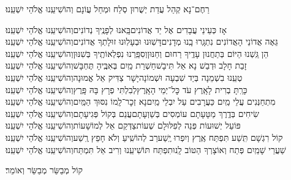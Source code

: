 \documentclass[twoside, openany, parskip=half, 11pt]{book}
\begin{document}
\begin{large}רַחֶם־נָא קְהַל עֲדַת יְשֻׁרוּן סְלַח וּמְחַל עֲוֹנָם וְהוֹשִׁיעֵֽנוּ אֱלֹהֵי יִשְׁעֵֽנוּ׃\end{large}

\begin{small}
	אָז כְּעֵינֵי עֲבָדִים אֶל יַד אֲדוֹנִים\hfill\break בָּֽאנוּ לְפָנֶֽיךָ נְדוֹנִים\hfill וְהוֹשִׁיעֵֽנוּ אֱלֹהֵי יִשְׁעֵֽנוּ׃\\
	גֵּאֶה אֲדוֹנֵי הָאֲדוֹנִים נִתְגָּֽרוּ בָֽנוּ מְדָנִים\hfill\break דָּשֽׁוּנוּ וּבְעָלֽוּנוּ זוּלָתְךָ אֲדוֹנִים\hfill וְהוֹשִׁיעֵֽנוּ אֱלֹהֵי יִשְׁעֵֽנוּ׃\\
	הֵן גַּֽשְׁנוּ הַיּוֹם בְּתַחֲנוּן עָדֶֽיךָ רַחוּם וְחַנּוּן\hfill\break וְסִפַּֽרְנוּ נִפְלְאוֹתֶֽיךָ בְּשִׁנּוּן\hfill וְהוֹשִׁיעֵֽנוּ אֱלֹהֵי יִשְׁעֵֽנוּ׃\\
	זָבַת חָלָב וּדְבַשׁ נָא אַל תִּיבָשׁ\hfill\break חַשְׁרַת מַֽיִם בְּאִבֶּֽיהָ תֶּחְבָּשׁ\hfill וְהוֹשִׁיעֵֽנוּ אֱלֹהֵי יִשְׁעֵֽנוּ׃\\
	טְעֵֽנוּ בִשְׁמֵנָה בְּיַד שִׁבְעָה וּשְׁמוֹנָה\hfill\break יָשָׁר צַדִּיק אֵל אֱמוּנָה\hfill וְהוֹשִׁיעֵֽנוּ אֱלֹהֵי יִשְׁעֵֽנוּ׃\\
	כָּרַֽתָּ בְרִית לָאָֽרֶץ עֹד כׇּל־יְמֵי הָאָֽרֶץ\hfill\break לְבִלְתִּי פְרָץ בָּהּ פָּֽרֶץ\hfill וְהוֹשִׁיעֵֽנוּ אֱלֹהֵי יִשְׁעֵֽנוּ׃\\
	מִתְחַנְּנִים עֲלֵי מַֽיִם כַּעֲרָבִים עַל יִבְלֵי מַֽיִם\hfill\break נָא זְכׇר־לָֽמוֹ נִסּוּךְ הַמַּֽיִם\hfill וְהוֹשִׁיעֵֽנוּ אֱלֹהֵי יִשְׁעֵֽנוּ׃\\
	שִׂיחִים בְּדֶֽרֶךְ מַטָּעָתָם עוֹמְסִים בְּשַׁוְעָתָם\hfill\break עֲנֵם בְּקוֹל פְּגִיעָתָם\hfill וְהוֹשִׁיעֵֽנוּ אֱלֹהֵי יִשְׁעֵֽנוּ׃\\
	פּוֹעֵל יְשׁוּעוֹת פְּנֵה לְפִלּוּלָם שְׁעוֹת\hfill\break צַדְּקֵם אֵל לְמוֹשָׁעוֹת\hfill וְהוֹשִׁיעֵֽנוּ אֱלֹהֵי יִשְׁעֵֽנוּ׃\\
	קוֹל רִגְשָׁם תִּֽשַׁע תִּפְתַּח אֶֽרֶץ וְיִפְרוּ יֶֽשַׁע\hfill\break רַב לְהוֹשִֽׁיעַ וְלֹא חָפֵץ רֶֽשַׁע\hfill וְהוֹשִׁיעֵֽנוּ אֱלֹהֵי יִשְׁעֵֽנוּ׃\\
	שַׁעֲרֵי שָׁמַֽיִם פְּתַח וְאוֹצָרְךָ הַטּוֹב לָֽנוּ\hfill\break תִפְתַּח תּוֹשִׁיעֵֽנוּ וְרִיב אַל תִּמְתַּח\hfill וְהוֹשִׁיעֵֽנוּ אֱלֹהֵי יִשְׁעֵֽנוּ׃\\
	
\end{small}

\begin{large}קוֹל מְבַשֵּׂר מְבַשֵּׂר וְאוֹמֵר׃\end{large}
\end{document}
